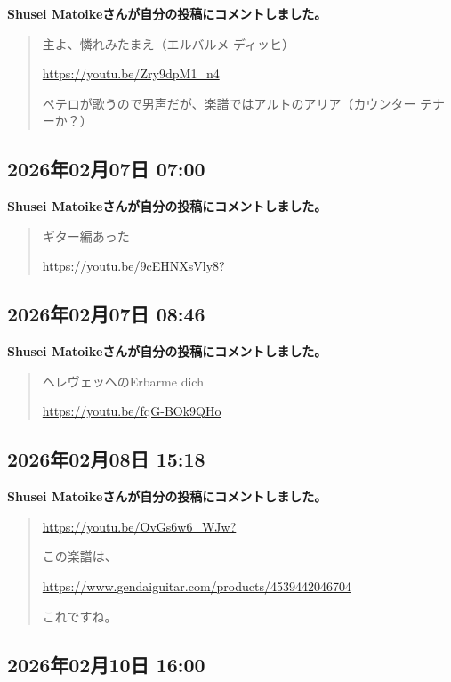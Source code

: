 \textbf{Shusei Matoikeさんが自分の投稿にコメントしました。}

\begin{quote}
主よ、憐れみたまえ（エルバルメ ディッヒ）

\url{https://youtu.be/Zry9dpM1_n4}

ペテロが歌うので男声だが、楽譜ではアルトのアリア（カウンター テナーか？）
\end{quote}

\subsection*{2026年02月07日 07:00}

\textbf{Shusei Matoikeさんが自分の投稿にコメントしました。}

\begin{quote}
ギター編あった

\url{https://youtu.be/9cEHNXsVly8?}
\end{quote}

\subsection*{2026年02月07日 08:46}

\textbf{Shusei Matoikeさんが自分の投稿にコメントしました。}

\begin{quote}
ヘレヴェッヘのErbarme dich

\url{https://youtu.be/fqG-BOk9QHo}
\end{quote}

\subsection*{2026年02月08日 15:18}

\textbf{Shusei Matoikeさんが自分の投稿にコメントしました。}

\begin{quote}
\url{https://youtu.be/OvGs6w6_WJw?}

この楽譜は、

\url{https://www.gendaiguitar.com/products/4539442046704}

これですね。
\end{quote}

\subsection*{2026年02月10日 16:00}

